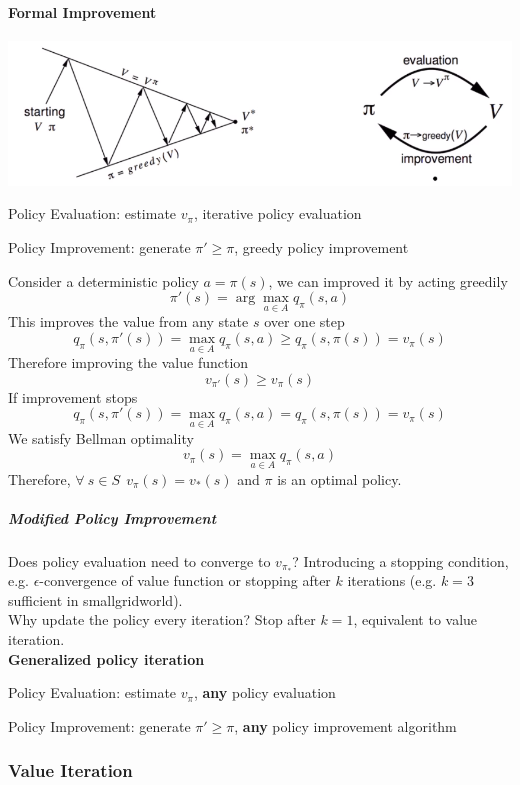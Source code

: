 \documentclass[10pt]{report}
\begin{document}
\paragraph{Formal Improvement}
\begin{center}
	\includegraphics[scale=0.5]{165.png}
\end{center}
\begin{list}{}{}
	\item Policy Evaluation: estimate $v_\pi$, iterative policy evaluation
	\item Policy Improvement: generate $\pi' \geq \pi$, greedy policy improvement
\end{list}
Consider a deterministic policy $a=\pi(s)$, we can improved it by acting greedily $$\pi'(s)=\arg\max_{a\in A} q_\pi(s,a)$$
This improves the value from any state $s$ over one step $$q_\pi(s,\pi'(s)) = \max_{a\in A} q_\pi(s,a)\geq q_\pi(s,\pi(s)) = v_\pi(s)$$
Therefore improving the value function
$$v_{\pi'}(s)\geq v_\pi(s)$$
If improvement stops
$$q_\pi(s,\pi'(s)) = \max_{a\in A}q_\pi(s,a) = q_\pi(s, \pi(s)) = v_\pi(s)$$
We satisfy Bellman optimality
$$v_\pi(s) = \max_{a\in A}q_\pi(s,a)$$
Therefore, $\forall\:s\in S\:\:v_\pi(s) = v_*(s)$ and $\pi$ is an optimal policy.
\subparagraph{Modified Policy Improvement} Does policy evaluation need to converge to $v_{\pi_*}$? Introducing a stopping condition, e.g. $\epsilon$-convergence of value function or stopping after $k$ iterations (e.g. $k=3$ sufficient in smallgridworld).\\
Why update the policy every iteration? Stop after $k=1$, equivalent to value iteration.\\
\textbf{Generalized policy iteration}\begin{list}{}{}
	\item Policy Evaluation: estimate $v_\pi$, \textbf{any} policy evaluation
	\item Policy Improvement: generate $\pi' \geq \pi$, \textbf{any} policy improvement algorithm
\end{list}
\subsubsection{Value Iteration}
\end{document}
